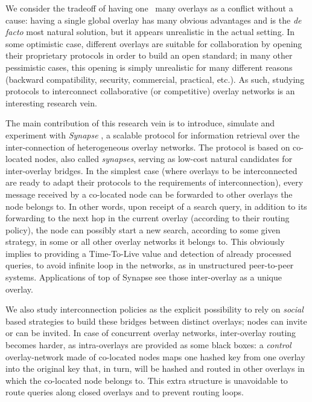 We consider the tradeoff of having one \vs\ many overlays as a
conflict without a cause: having a single global overlay has many
obvious advantages and is the \textit{de facto} most natural solution,
but it appears unrealistic in the actual setting. In some optimistic
case, different overlays are suitable for collaboration by opening
their proprietary protocols in order to build an open standard; in
many other pessimistic cases, this opening is simply unrealistic for
many different reasons (backward compatibility, security, commercial,
practical, etc.). As such, studying protocols to interconnect
collaborative (or competitive) overlay networks is an interesting
research vein.

The main contribution of this research vein is to introduce, simulate
and experiment with \emph{Synapse} \cite{LTVBCM09}, a scalable
protocol for information retrieval over the inter-connection of
heterogeneous overlay networks. The protocol is based on co-located
nodes, also called \emph{synapses}, serving as low-cost natural
candidates for inter-overlay bridges. In the simplest case (where
overlays to be interconnected are ready to adapt their protocols to
the requirements of interconnection), every message received by a
co-located node can be forwarded to other overlays the node belongs
to. In other words, upon receipt of a search query, in addition to its
forwarding to the next hop in the current overlay (according to their
routing policy), the node can possibly start a new search, according
to some given strategy, in some or all other overlay networks it
belongs to. This obviously implies to providing a Time-To-Live value
and detection of already processed queries, to avoid infinite loop in
the networks, as in unstructured peer-to-peer systems.  Applications
of top of Synapse see those inter-overlay as a unique overlay.

We also study interconnection policies as the explicit possibility to
rely on \emph{social} based strategies to build these bridges between
distinct overlays; nodes can invite or can be invited. In case of
concurrent overlay networks, inter-overlay routing becomes harder, as
intra-overlays are provided as some black boxes: a \emph{control}
overlay-network made of co-located nodes maps one hashed key from one
overlay into the original key that, in turn, will be hashed and routed
in other overlays in which the co-located node belongs to. This extra
structure is unavoidable to route queries along closed overlays and to
prevent routing loops.

